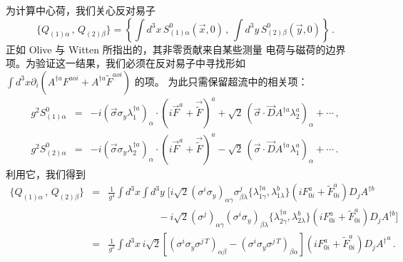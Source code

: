 为计算中心荷，我们关心反对易子
$$
\{Q_{(1)\alpha}\,,\,Q_{(2)\beta}\} =
\left\{\int d^3x\,S^0_{(1)\alpha}(\vec{x},0)\,,\,\int d^3y\,S^0_{(2)
\beta}(\vec{y},0)\right\} \,.
$$
正如 Olive 与 Witten \cite{Olive-Witten} 所指出的，其非零贡献来自某些测量
电荷与磁荷的边界项。为验证这一结果，我们必须在反对易子中寻找形如
$\int d^3 x\partial_i 
(A^{\dagger a} F^{aoi} + A^{\dagger a}\widetilde F^{aoi})$ 的项。
为此只需保留超流中的相关项：
\begin{eqnarray}
g^2S^0_{(1)\alpha}&=&-i(\vec{\sigma}\sigma_y\lambda^{\dagger a}_1)_\alpha
\cdot (i\vec{F}^a+\vec{\widetilde F})^a +\sqrt{2}\,(\vec{\sigma}\cdot
\vec{D}A^{\dagger a}\lambda^a_{2})_\alpha + \cdots \,,\nonumber\\
g^2S^0_{(2)\alpha}&=&-i(\vec{\sigma}\sigma_y\lambda^{\dagger a}_2)_\alpha
\cdot (i\vec{F}^a+\vec{\widetilde F})^a -\sqrt{2}\,(\vec{\sigma}\cdot
\vec{D}A^{\dagger a}\lambda^a_{1})_\alpha + \cdots\,.
\end{eqnarray}
利用它，我们得到
\begin{eqnarray}
\{Q_{(1)\alpha}\,,\,Q_{(2)\beta}\}&=&\frac{1}{g^4}\int d^3x\int d^3y\;
\big[i\sqrt{2}(\sigma^i\sigma_y)_{\alpha\gamma}\sigma^j_{\beta\lambda}
\{\lambda^{\dagger a}_{1\gamma},\lambda^b_{1\lambda}\}(iF^a_{0i}+
\widetilde F^a_{0i})D_j A^{\dagger b}     \nonumber\\
&&\qquad\qquad\quad -i\sqrt{2}(\sigma^j)_{\alpha\gamma}(\sigma^i
\sigma_y)_{\beta\lambda}\{\lambda^{\dagger a}_{2\gamma},
\lambda^b_{2\lambda}\}(iF^a_{0i}+\widetilde F^a_{0i})D_j 
A^{\dagger b}\big]      \nonumber \\
&=&\frac{1}{g^2}\int d^3x\,i\sqrt{2}\left[(\sigma^i\sigma_y
\sigma^{j\,T})_{\alpha\beta}-(\sigma^i\sigma_y\sigma^{j\,T})_{\beta\alpha}
\right](iF^a_{0i}+\widetilde F^a_{0i})D_j{A^\dagger}^{a}\,. \nonumber
\end{eqnarray}

